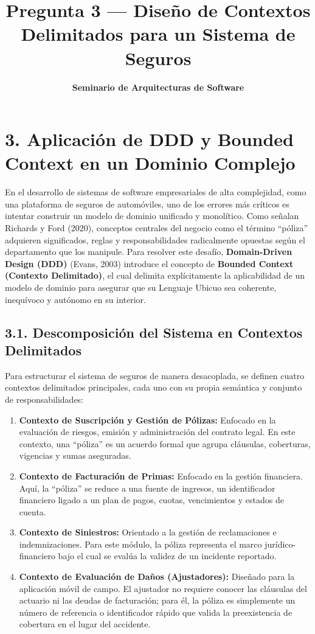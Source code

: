 \documentclass[12pt,a4paper]{article}
\title{\textbf{Pregunta 3 --- Diseño de Contextos Delimitados para un Sistema de Seguros}}
\author{\textbf{Seminario de Arquitecturas de Software}}
\date{}
\begin{document}
\maketitle

\section*{3. Aplicación de DDD y Bounded Context en un Dominio Complejo}

En el desarrollo de sistemas de software empresariales de alta complejidad, como una plataforma de seguros de automóviles, uno de los errores más críticos es intentar construir un modelo de dominio unificado y monolítico. Como señalan Richards y Ford (2020), conceptos centrales del negocio como el término ``póliza'' adquieren significados, reglas y responsabilidades radicalmente opuestas según el departamento que los manipule. Para resolver este desafío, \textbf{Domain-Driven Design (DDD)} (Evans, 2003) introduce el concepto de \textbf{Bounded Context (Contexto Delimitado)}, el cual delimita explícitamente la aplicabilidad de un modelo de dominio para asegurar que su Lenguaje Ubicuo sea coherente, inequívoco y autónomo en su interior.

\subsection*{3.1. Descomposición del Sistema en Contextos Delimitados}
Para estructurar el sistema de seguros de manera desacoplada, se definen cuatro contextos delimitados principales, cada uno con su propia semántica y conjunto de responsabilidades:
\begin{enumerate}[label=\arabic*.]
    \item \textbf{Contexto de Suscripción y Gestión de Pólizas:} Enfocado en la evaluación de riesgos, emisión y administración del contrato legal. En este contexto, una ``póliza'' es un acuerdo formal que agrupa cláusulas, coberturas, vigencias y sumas aseguradas.
    \item \textbf{Contexto de Facturación de Primas:} Enfocado en la gestión financiera. Aquí, la ``póliza'' se reduce a una fuente de ingresos, un identificador financiero ligado a un plan de pagos, cuotas, vencimientos y estados de cuenta.
    \item \textbf{Contexto de Siniestros:} Orientado a la gestión de reclamaciones e indemnizaciones. Para este módulo, la póliza representa el marco jurídico-financiero bajo el cual se evalúa la validez de un incidente reportado.
    \item \textbf{Contexto de Evaluación de Daños (Ajustadores):} Diseñado para la aplicación móvil de campo. El ajustador no requiere conocer las cláusulas del actuario ni las deudas de facturación; para él, la póliza es simplemente un número de referencia o identificador rápido que valida la preexistencia de cobertura en el lugar del accidente.
\end{enumerate}
\end{document}
